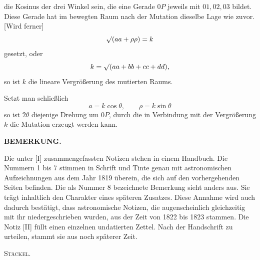 %
\noindent die Kosinus der drei Winkel sein, die eine Gerade $0P$ jeweils mit $01,02,03$ bildet. Diese Gerade hat im bewegten Raum nach der Mutation dieselbe Lage wie zuvor. [Wird ferner]
\[
\mathord{\surd}(aa+\rho\rho)=k
\]
gesetzt, oder
\[
k=\mathord{\surd}(aa+bb+cc+dd),
\]
so ist $k$ die lineare Vergrößerung des mutierten Raums.

Setzt man schließlich
\[
a=k\cos\theta,\qquad \rho=k\sin\theta
\]
so ist $2\theta$ diejenige Drehung um $0P$, durch die in Verbindung mit der Vergrößerung $k$ die Mutation erzeugt werden kann.

\begin{center}\bfseries BEMERKUNG.\end{center}

Die unter [I] zusammengefassten Notizen stehen in einem Handbuch. Die Nummern 1 bis 7 stimmen in Schrift und Tinte genau mit astronomischen Aufzeichnungen aus dem Jahr 1819 überein, die sich auf den vorhergehenden Seiten befinden. Die als Nummer 8 bezeichnete Bemerkung sieht anders aus. Sie trägt inhaltlich den Charakter eines späteren Zusatzes. Diese Annahme wird auch dadurch bestätigt, dass astronomische Notizen, die augenscheinlich gleichzeitig mit ihr niedergeschrieben wurden, aus der Zeit von 1822 bis 1823 stammen. Die Notiz [II] füllt einen einzelnen undatierten Zettel. Nach der Handschrift zu urteilen, stammt sie aus noch späterer Zeit.
\begin{flushright}\textsc{Stäckel.}\end{flushright}
